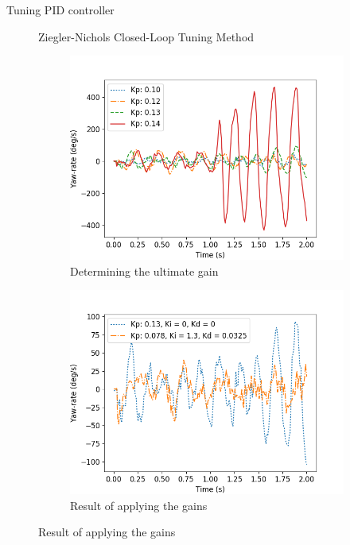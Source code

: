 \documentclass{beamer}
\begin{document}
\begin{frame}{Tuning PID controller}
	\begin{figure}
		Ziegler-Nichols Closed-Loop Tuning Method
		\begin{center}
		\begin{subfigure}[b]{0.49\textwidth}
			\includegraphics[width=\textwidth]{pics/straight_ku.png}
			\caption*{Determining the ultimate gain}
		\end{subfigure}
		\begin{subfigure}[b]{0.49\textwidth}
			\includegraphics[width=\textwidth]{pics/straight_ku_with_tu.png}
			\caption*{Result of applying the gains}
		\end{subfigure}
		\end{center}
	\end{figure}
\end{frame}
\end{document}
